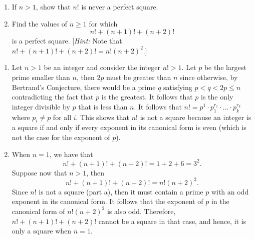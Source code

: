 \begin{exercise}
    \begin{enumerate}
        \item If $n > 1$, show that $n!$ is never a perfect square.
        \item Find the values of $n \geq 1$ for which
        $$n! + (n+1)! + (n+2)!$$
        is a perfect square. [\textit{Hint:} Note that $n! + (n+1)! + (n+2)! = n!(n+2)^2$.]
    \end{enumerate}
\end{exercise}

\begin{solution}
    \begin{enumerate}
        \item Let $n > 1$ be an integer and consider the integer $n! > 1$. Let $p$ be the largest prime smaller than $n$, then $2p$ must be greater than $n$ since otherwise, by Bertrand's Conjecture, there would be a prime $q$ satisfying $p < q < 2p \leq n$ contradicting the fact that $p$ is the greatest. It follows that $p$ is the only integer divisible by $p$ that is less than $n$. It follows that $n! = p^1 \cdot p_1^{r_1}\cdot \dots \cdot p_k^{r_k}$ where $p_i \neq p$ for all $i$. This shows that $n!$ is not a square because an integer is a square if and only if every exponent in its canonical form is even (which is not the case for the exponent of $p$).
        \item When $n = 1$, we have that
        $$n! + (n+1)! + (n+2)! = 1 + 2 + 6 = 3^2.$$
        Suppose now that $n > 1$, then
        $$n! + (n+1)! + (n+2)! = n!(n+2)^2.$$
        Since $n!$ is not a square (part a), then it must contain a prime $p$ with an odd exponent in its canonical form. It follows that the exponent of $p$ in the canonical form of $n!(n+2)^2$ is also odd. Therefore, $n! + (n+1)! + (n+2)!$ cannot be a square in that case, and hence, it is only a square when $n = 1$.
    \end{enumerate}
\end{solution}